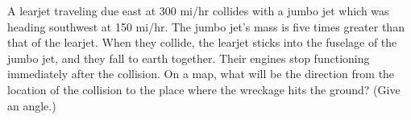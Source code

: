         A learjet traveling due east at 300 mi/hr collides with
        a jumbo jet which was heading southwest at 150 mi/hr. The
        jumbo jet's mass is five times greater than that of the
        learjet. When they collide, the learjet sticks into the
        fuselage of the jumbo jet, and they fall to earth together.
        Their engines stop functioning immediately after the
        collision. On a map, what will be the direction from the
        location of the collision to the place where the wreckage
        hits the ground? (Give an angle.)\answercheck

